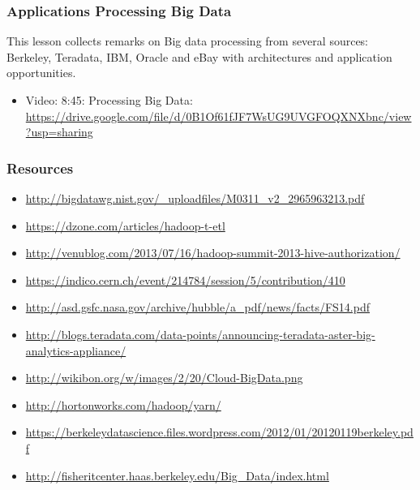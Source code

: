\subsubsection{Applications Processing Big
Data}\label{applications-processing-big-data}

This lesson collects remarks on Big data processing from several
sources: Berkeley, Teradata, IBM, Oracle and eBay with architectures and
application opportunities.

\begin{itemize}
\tightlist
\item
  Video: 8:45: Processing Big Data:
  \url{https://drive.google.com/file/d/0B1Of61fJF7WsUG9UVGFOQXNXbnc/view?usp=sharing}
\end{itemize}

\subsubsection{Resources}\label{resources-4}

\begin{itemize}
\tightlist
\item
  \url{http://bigdatawg.nist.gov/_uploadfiles/M0311_v2_2965963213.pdf}
\item
  \url{https://dzone.com/articles/hadoop-t-etl}
\item
  \url{http://venublog.com/2013/07/16/hadoop-summit-2013-hive-authorization/}
\item
  \url{https://indico.cern.ch/event/214784/session/5/contribution/410}
\item
  \url{http://asd.gsfc.nasa.gov/archive/hubble/a_pdf/news/facts/FS14.pdf}
\item
  \url{http://blogs.teradata.com/data-points/announcing-teradata-aster-big-analytics-appliance/}
\item
  \url{http://wikibon.org/w/images/2/20/Cloud-BigData.png}
\item
  \url{http://hortonworks.com/hadoop/yarn/}
\item
  \url{https://berkeleydatascience.files.wordpress.com/2012/01/20120119berkeley.pdf}
\item
  \url{http://fisheritcenter.haas.berkeley.edu/Big_Data/index.html}
\end{itemize}
